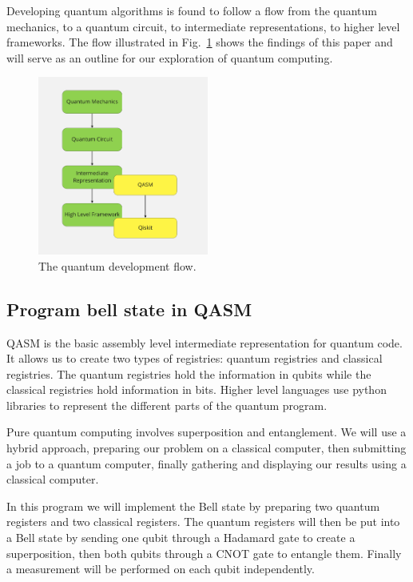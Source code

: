 \documentclass[conference]{IEEEtran}
\begin{document}
Developing quantum algorithms is found to follow a flow from the quantum mechanics, to a quantum circuit, to intermediate representations, to higher level frameworks. The flow illustrated in Fig.~\ref{fig:devflow} shows the findings of this paper and will serve as an outline for our exploration of quantum computing. 
\begin{figure}[H]
    \centering
    \includegraphics[width=0.5\textwidth]{flowchart.png}
    \caption{The quantum development flow.}
    \label{fig:devflow}
\end{figure}

\subsection{Program bell state in QASM}

QASM is the basic assembly level intermediate representation for quantum code. It allows us to create two types of registries: quantum registries and classical registries. The quantum registries hold the information in qubits while the classical registries hold information in bits. Higher level languages use python libraries to represent the different parts of the quantum program.

Pure quantum computing involves superposition and entanglement. We will use a hybrid approach, preparing our problem on a classical computer, then submitting a job to a quantum computer, finally gathering and displaying our results using a classical computer. 

In this program we will implement the Bell state by preparing two quantum registers and two classical registers. The quantum registers will then be put into a Bell state by sending one qubit through a Hadamard gate to create a superposition, then both qubits through a CNOT gate to entangle them. Finally a measurement will be performed on each qubit independently.
\end{document}
